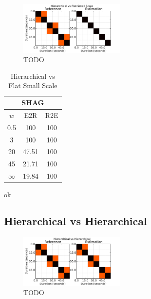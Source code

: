 \documentclass{article}
\begin{document}
\begin{figure}
  \centering
  \includegraphics[width=0.47\textwidth]{plots/hier-flatsmall.pdf}
  \caption{TODO}
  \label{fig:hier-flatsmall}
\end{figure}%

\begin{table}
 \begin{center}
   \begin{tabular}{|c|c|c|}
  \hline
  \multicolumn{3}{|c|}{\textbf{SHAG}} \\
  \hline
  $w$       & E2R    & R2E      \\
  \hline
  0.5       & 100       & 100      \\     
  3         & 100       & 100      \\
  20        & 47.51     & 100    \\
  45        & 21.71     & 100    \\
  $\infty$  & 19.84     & 100    \\
  \hline
 \end{tabular}
\end{center}
  \caption{Hierarchical vs Flat Small Scale}
  \label{tab:hier-flatsmall}
\end{table}
ok

\subsection{Hierarchical vs Hierarchical}

\begin{figure}
  \centering
  \includegraphics[width=0.47\textwidth]{plots/hier-hier.pdf}
  \caption{TODO}
  \label{fig:hier-hier}
\end{figure}%
\end{document}

